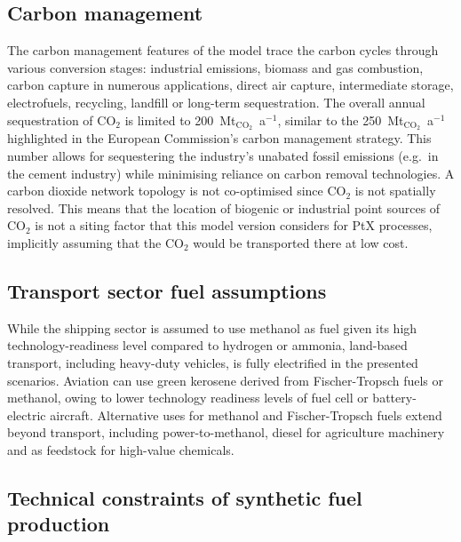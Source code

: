 \subsection*{Carbon management}
\label{sec:methods-carbon}

The carbon management features of the model trace the carbon cycles through
various conversion stages: industrial emissions, biomass and gas combustion,
carbon capture in numerous applications, direct air capture, intermediate
storage, electrofuels, recycling, landfill or long-term sequestration. The
overall annual sequestration of CO$_2$ is limited to
200~Mt$_{\text{CO}_2}$~a$^{-1}$, similar to the 250~Mt$_{\text{CO}_2}$~a$^{-1}$
highlighted in the European Commission's carbon management
strategy.\cite{europeancommissionAmbitiousIndustrialCarbon2024} This number
allows for sequestering the industry's unabated fossil emissions (e.g.~in the
cement industry) while minimising reliance on carbon removal technologies. A
carbon dioxide network topology is not co-optimised since CO$_2$ is not
spatially resolved. This means that the location of biogenic or industrial point
sources of CO$_2$ is not a siting factor that this model version considers for
PtX processes, implicitly assuming that the CO$_2$ would be transported there at
low cost. \cite{hofmannDesigningCO22023,hofmannH2CO2Network2024}

\subsection*{Transport sector fuel assumptions}
\label{sec:methods-transport}

While the shipping sector is assumed to use methanol as fuel given its high
technology-readiness level compared to hydrogen or
ammonia,\cite{ieaETPCleanEnergy2024} land-based transport, including heavy-duty
vehicles, is fully electrified in the presented
scenarios.\cite{linkRapidlyDecliningCosts2024} Aviation can use green kerosene
derived from Fischer-Tropsch fuels or methanol, owing to lower technology
readiness levels of fuel cell or battery-electric
aircraft.\cite{ieaETPCleanEnergy2024} Alternative uses for methanol and
Fischer-Tropsch fuels extend beyond transport, including
power-to-methanol,\cite{brownUltralongdurationEnergyStorage2023} diesel for
agriculture machinery and as feedstock for high-value chemicals.

\subsection*{Technical constraints of synthetic fuel production}
\label{sec:methods-efuels}

